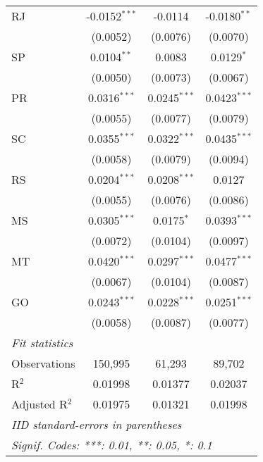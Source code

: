 \begin{tabular}{lccc}
   RJ              & -0.0152$^{***}$         & -0.0114                 & -0.0180$^{**}$\\   
                   & (0.0052)                & (0.0076)                & (0.0070)\\   
   SP              & 0.0104$^{**}$           & 0.0083                  & 0.0129$^{*}$\\   
                   & (0.0050)                & (0.0073)                & (0.0067)\\   
   PR              & 0.0316$^{***}$          & 0.0245$^{***}$          & 0.0423$^{***}$\\   
                   & (0.0055)                & (0.0077)                & (0.0079)\\   
   SC              & 0.0355$^{***}$          & 0.0322$^{***}$          & 0.0435$^{***}$\\   
                   & (0.0058)                & (0.0079)                & (0.0094)\\   
   RS              & 0.0204$^{***}$          & 0.0208$^{***}$          & 0.0127\\   
                   & (0.0055)                & (0.0076)                & (0.0086)\\   
   MS              & 0.0305$^{***}$          & 0.0175$^{*}$            & 0.0393$^{***}$\\   
                   & (0.0072)                & (0.0104)                & (0.0097)\\   
   MT              & 0.0420$^{***}$          & 0.0297$^{***}$          & 0.0477$^{***}$\\   
                   & (0.0067)                & (0.0104)                & (0.0087)\\   
   GO              & 0.0243$^{***}$          & 0.0228$^{***}$          & 0.0251$^{***}$\\   
                   & (0.0058)                & (0.0087)                & (0.0077)\\   
   \midrule
   \emph{Fit statistics}\\
   Observations    & 150,995                 & 61,293                  & 89,702\\  
   R$^2$           & 0.01998                 & 0.01377                 & 0.02037\\  
   Adjusted R$^2$  & 0.01975                 & 0.01321                 & 0.01998\\  
   \midrule \midrule
   \multicolumn{4}{l}{\emph{IID standard-errors in parentheses}}\\
   \multicolumn{4}{l}{\emph{Signif. Codes: ***: 0.01, **: 0.05, *: 0.1}}\\
\end{tabular}
\par\endgroup



